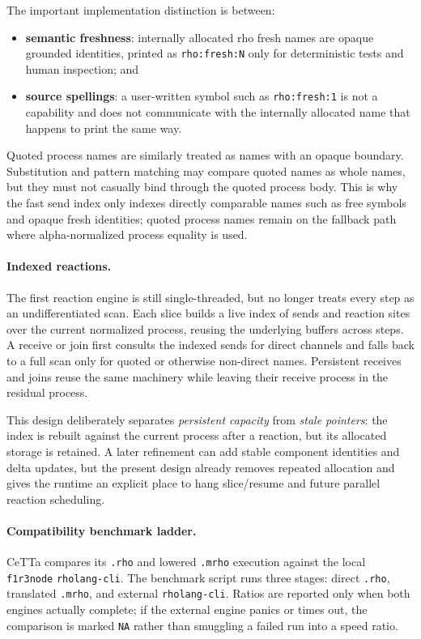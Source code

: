 \documentclass[11pt]{article}
\newcommand{\code}[1]{\texttt{#1}}
\newcommand{\CeTTa}{\textup{CeTTa}}
\begin{document}
The important implementation distinction is between:
\begin{itemize}
\item \textbf{semantic freshness}: internally allocated rho fresh names are
  opaque grounded identities, printed as \code{rho:fresh:N} only for
  deterministic tests and human inspection; and
\item \textbf{source spellings}: a user-written symbol such as
  \code{rho:fresh:1} is not a capability and does not communicate with the
  internally allocated name that happens to print the same way.
\end{itemize}

Quoted process names are similarly treated as names with an opaque boundary.
Substitution and pattern matching may compare quoted names as whole names, but
they must not casually bind through the quoted process body.  This is why the
fast send index only indexes directly comparable names such as free symbols and
opaque fresh identities; quoted process names remain on the fallback path where
alpha-normalized process equality is used.

\paragraph{Indexed reactions.}
The first reaction engine is still single-threaded, but no longer treats every
step as an undifferentiated scan.  Each slice builds a live index of sends and
reaction sites over the current normalized process, reusing the underlying
buffers across steps.  A receive or join first consults the indexed sends for
direct channels and falls back to a full scan only for quoted or otherwise
non-direct names.  Persistent receives and joins reuse the same machinery while
leaving their receive process in the residual process.

This design deliberately separates \emph{persistent capacity} from
\emph{stale pointers}: the index is rebuilt against the current process after a
reaction, but its allocated storage is retained.  A later refinement can add
stable component identities and delta updates, but the present design already
removes repeated allocation and gives the runtime an explicit place to hang
slice/resume and future parallel reaction scheduling.

\paragraph{Compatibility benchmark ladder.}
\CeTTa{} compares its \code{.rho} and lowered \code{.mrho} execution against
the local \code{f1r3node} \code{rholang-cli}.  The benchmark script runs three
stages: direct \code{.rho}, translated \code{.mrho}, and external
\code{rholang-cli}.  Ratios are reported only when both engines actually
complete; if the external engine panics or times out, the comparison is marked
\code{NA} rather than smuggling a failed run into a speed ratio.
\end{document}
